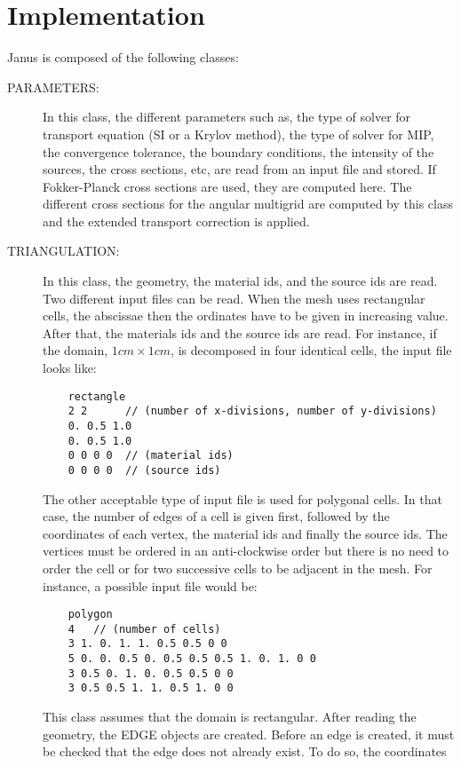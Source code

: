 \section{Implementation}
Janus is composed of the following classes:
\begin{description}
  \item[PARAMETERS:] In this class, the different parameters such as, the 
    type of solver for transport equation (SI or a Krylov method), the type 
    of solver for MIP, the convergence tolerance, the boundary conditions, 
    the intensity of the sources, the cross sections, etc, are read from an
    input file and stored. If Fokker-Planck cross sections are used, they 
    are computed here. The different cross sections for the angular
    multigrid are computed by this class and the extended transport correction 
    is applied.
  \item[TRIANGULATION:] In this class, the geometry, the material ids, and the
    source ids are read. Two different input files can be read. When the mesh
    uses rectangular cells, the abscissae then the ordinates have to be given 
    in increasing value. After that, the materials ids and the source ids are
    read. For instance, if the domain, $1cm \times 1cm$, is decomposed 
    in four identical cells, the input file looks like:
    \begin{verbatim}
    rectangle
    2 2      // (number of x-divisions, number of y-divisions)
    0. 0.5 1.0
    0. 0.5 1.0
    0 0 0 0  // (material ids)
    0 0 0 0  // (source ids)
    \end{verbatim}
    The other acceptable type of input file is used for polygonal cells. In 
    that case, the number of edges of a cell is given first, followed by the 
    coordinates of each vertex, the material ids and finally the source ids.
    The vertices must be ordered in an anti-clockwise order but there is no need
    to order the cell or for two successive cells to be adjacent in the mesh. 
    For instance, a possible input file would be:
    \begin{verbatim}
    polygon
    4   // (number of cells)
    3 1. 0. 1. 1. 0.5 0.5 0 0
    5 0. 0. 0.5 0. 0.5 0.5 0.5 1. 0. 1. 0 0
    3 0.5 0. 1. 0. 0.5 0.5 0 0
    3 0.5 0.5 1. 1. 0.5 1. 0 0
    \end{verbatim}
    This class assumes that the domain is rectangular. After reading the
    geometry, the EDGE objects are created. Before an edge is created, it must
    be checked that the edge does not already exist. To do so, the coordinates

\end{description}
